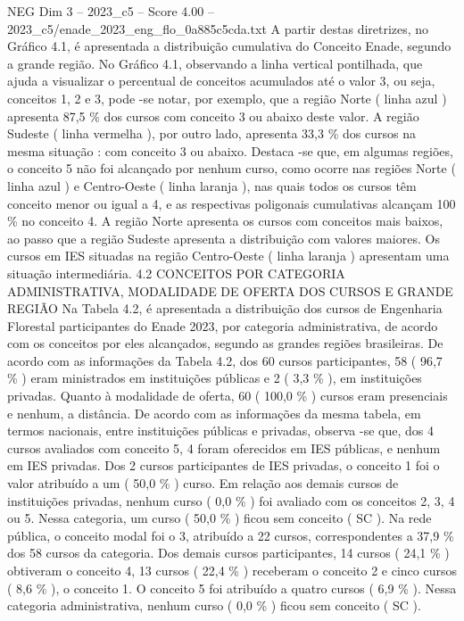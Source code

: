 \begin{textsample}{NEG Dim 3 – 2023\_c5 – Score 4.00 – 2023\_c5/enade\_2023\_eng\_flo\_0a885c5cda.txt}
A partir destas diretrizes, no Gráfico 4.1, é apresentada a distribuição cumulativa do Conceito Enade, segundo a grande região.
No Gráfico 4.1, observando a linha vertical pontilhada, que ajuda a visualizar o percentual de conceitos acumulados até o valor 3, ou seja, conceitos 1, 2 e 3, pode -se notar, por exemplo, que a região Norte ( linha azul ) apresenta 87,5 \% dos cursos com conceito 3 ou abaixo deste valor.
A região Sudeste ( linha vermelha ), por outro lado, apresenta 33,3 \% dos cursos na mesma situação : com conceito 3 ou abaixo.
Destaca -se que, em algumas regiões, o conceito 5 não foi alcançado por nenhum curso, como ocorre nas regiões Norte ( linha azul ) e Centro-Oeste ( linha laranja ), nas quais todos os cursos têm conceito menor ou igual a 4, e as respectivas poligonais cumulativas alcançam 100 \% no conceito 4.
A região Norte apresenta os cursos com conceitos mais baixos, ao passo que a região Sudeste apresenta a distribuição com valores maiores.
Os cursos em IES situadas na região Centro-Oeste ( linha laranja ) apresentam uma situação intermediária. 4.2 CONCEITOS POR CATEGORIA ADMINISTRATIVA, MODALIDADE DE OFERTA DOS CURSOS E GRANDE REGIÃO Na Tabela 4.2, é apresentada a distribuição dos cursos de Engenharia Florestal participantes do Enade 2023, por categoria administrativa, de acordo com os conceitos por eles alcançados, segundo as grandes regiões brasileiras.
De acordo com as informações da Tabela 4.2, dos 60 cursos participantes, 58 ( 96,7 \% ) eram ministrados em instituições públicas e 2 ( 3,3 \% ), em instituições privadas.
Quanto à modalidade de oferta, 60 ( 100,0 \% ) cursos eram presenciais e nenhum, a distância.
De acordo com as informações da mesma tabela, em termos nacionais, entre instituições públicas e privadas, observa -se que, dos 4 cursos avaliados com conceito 5, 4 foram oferecidos em IES públicas, e nenhum em IES privadas.
Dos 2 cursos participantes de IES privadas, o conceito 1 foi o valor atribuído a um ( 50,0 \% ) curso.
Em relação aos demais cursos de instituições privadas, nenhum curso ( 0,0 \% ) foi avaliado com os conceitos 2, 3, 4 ou 5.
Nessa categoria, um curso ( 50,0 \% ) ficou sem conceito ( SC ).
Na rede pública, o conceito modal foi o 3, atribuído a 22 cursos, correspondentes a 37,9 \% dos 58 cursos da categoria.
Dos demais cursos participantes, 14 cursos ( 24,1 \% ) obtiveram o conceito 4, 13 cursos ( 22,4 \% ) receberam o conceito 2 e cinco cursos ( 8,6 \% ), o conceito 1.
O conceito 5 foi atribuído a quatro cursos ( 6,9 \% ).
Nessa categoria administrativa, nenhum curso ( 0,0 \% ) ficou sem conceito ( SC ).

\end{textsample}
